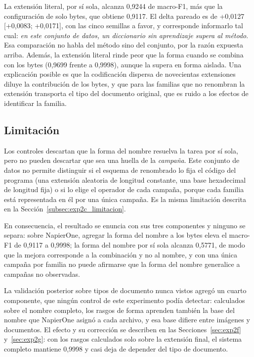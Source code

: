 La extensión literal, por sí sola, alcanza 0,9244 de macro-F1, más que la configuración de solo bytes, que obtiene 0,9117. El delta pareado es de +0,0127 [+0,0083; +0,0171], con las cinco semillas a favor, y corresponde informarlo tal cual: \textit{en este conjunto de datos, un diccionario sin aprendizaje supera al método}. Esa comparación no habla del método sino del conjunto, por la razón expuesta arriba. Además, la extensión literal rinde peor que la forma cuando se combina con los bytes (0,9699 frente a 0,9998), aunque la supera en forma aislada. Una explicación posible es que la codificación dispersa de novecientas extensiones diluye la contribución de los bytes, y que para las familias que no renombran la extensión transporta el tipo del documento original, que es ruido a los efectos de identificar la familia.

\subsection{Limitación}
\label{subsec:exp2d_limitacion}

Los controles descartan que la forma del nombre resuelva la tarea por sí sola, pero no pueden descartar que sea una huella de la \textit{campaña}. Este conjunto de datos no permite distinguir si el esquema de renombrado lo fija el código del programa (una extensión aleatoria de longitud constante, una base hexadecimal de longitud fija) o si lo elige el operador de cada campaña, porque cada familia está representada en él por una única campaña. Es la misma limitación descrita en la Sección~\ref{subsec:exp2c_limitacion}.

En consecuencia, el resultado se enuncia con sus tres componentes y ninguno se separa: sobre NapierOne, agregar la forma del nombre a los bytes eleva el macro-F1 de 0,9117 a 0,9998; la forma del nombre por sí sola alcanza 0,5771, de modo que la mejora corresponde a la combinación y no al nombre, y con una única campaña por familia no puede afirmarse que la forma del nombre generalice a campañas no observadas.

La validación posterior sobre tipos de documento nunca vistos agregó un cuarto componente, que ningún control de este experimento podía detectar: calculados sobre el nombre completo, los rasgos de forma aprenden también la base del nombre que NapierOne asignó a cada archivo, y esa base difiere entre imágenes y documentos. El efecto y su corrección se describen en las Secciones~\ref{sec:exp2f} y~\ref{sec:exp2g}: con los rasgos calculados solo sobre la extensión final, el sistema completo mantiene 0,9998 y casi deja de depender del tipo de documento.


